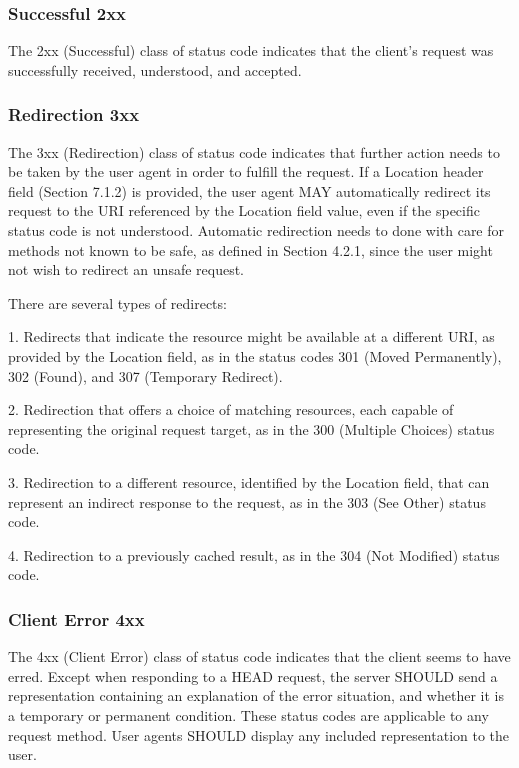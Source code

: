    \subsubsection{Successful 2xx}

   The 2xx (Successful) class of status code indicates that the client's
   request was successfully received, understood, and accepted.



   \subsubsection{Redirection 3xx}

   The 3xx (Redirection) class of status code indicates that further
   action needs to be taken by the user agent in order to fulfill the
   request.  If a Location header field (Section 7.1.2) is provided, the
   user agent MAY automatically redirect its request to the URI
   referenced by the Location field value, even if the specific status
   code is not understood.  Automatic redirection needs to done with
   care for methods not known to be safe, as defined in Section 4.2.1,
   since the user might not wish to redirect an unsafe request.

   There are several types of redirects:

   1.  Redirects that indicate the resource might be available at a
       different URI, as provided by the Location field, as in the
       status codes 301 (Moved Permanently), 302 (Found), and 307
       (Temporary Redirect).

   2.  Redirection that offers a choice of matching resources, each
       capable of representing the original request target, as in the
       300 (Multiple Choices) status code.

   3.  Redirection to a different resource, identified by the Location
       field, that can represent an indirect response to the request, as
       in the 303 (See Other) status code.

   4.  Redirection to a previously cached result, as in the 304 (Not
       Modified) status code.



\subsubsection{Client Error 4xx}

   The 4xx (Client Error) class of status code indicates that the client
   seems to have erred.  Except when responding to a HEAD request, the
   server SHOULD send a representation containing an explanation of the
   error situation, and whether it is a temporary or permanent
   condition.  These status codes are applicable to any request method.
   User agents SHOULD display any included representation to the user.




